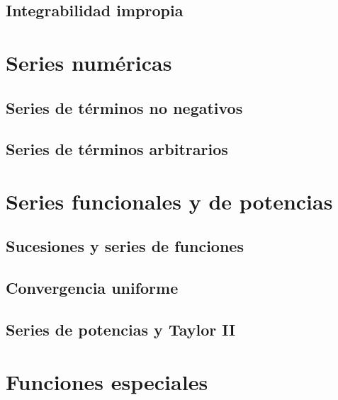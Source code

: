 \documentclass{article}
\begin{document}
\subsection{Integrabilidad impropia}





\section{Series numéricas}

\subsection{Series de términos no negativos}

\subsection{Series de términos arbitrarios}





\section{Series funcionales y de potencias}

\subsection{Sucesiones y series de funciones}

\subsection{Convergencia uniforme}

\subsection{Series de potencias y Taylor II}



\section{Funciones especiales}
\end{document}
